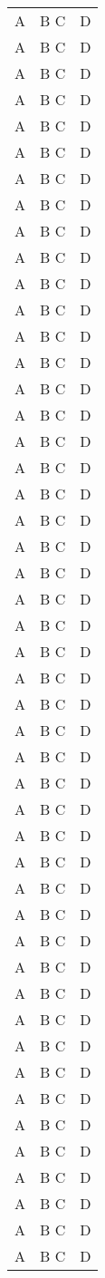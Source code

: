 \begin{longtable}{|l|l|l|}
A & B C & D \\
A & B C & D \\
A & B C & D \\
A & B C & D \\
A & B C & D \\
A & B C & D \\
A & B C & D \\
A & B C & D \\
A & B C & D \\
A & B C & D \\
A & B C & D \\
A & B C & D \\
A & B C & D \\
A & B C & D \\
A & B C & D \\
A & B C & D \\
A & B C & D \\
A & B C & D \\
A & B C & D \\
A & B C & D \\
A & B C & D \\
A & B C & D \\
A & B C & D \\
A & B C & D \\
A & B C & D \\
A & B C & D \\
A & B C & D \\
A & B C & D \\
A & B C & D \\
A & B C & D \\
A & B C & D \\
A & B C & D \\
A & B C & D \\
A & B C & D \\
A & B C & D \\
A & B C & D \\
A & B C & D \\
A & B C & D \\
A & B C & D \\
A & B C & D \\
A & B C & D \\
A & B C & D \\
A & B C & D \\
A & B C & D \\
A & B C & D \\
A & B C & D \\
A & B C & D \\
A & B C & D \\

\end{longtable}
